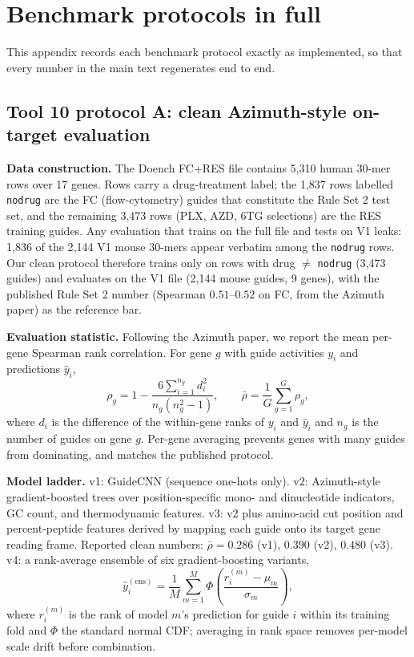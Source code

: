 \section{Benchmark protocols in full}
This appendix records each benchmark protocol exactly as implemented, so that
every number in the main text regenerates end to end.

\subsection{Tool 10 protocol A: clean Azimuth-style on-target evaluation}
\textbf{Data construction.} The Doench FC+RES file contains 5{,}310 human
30-mer rows over 17 genes. Rows carry a drug-treatment label; the 1{,}837
rows labelled \texttt{nodrug} are the FC (flow-cytometry) guides that
constitute the Rule Set 2 test set, and the remaining 3{,}473 rows (PLX,
AZD, 6TG selections) are the RES training guides. Any evaluation that trains
on the full file and tests on V1 leaks: 1{,}836 of the 2{,}144 V1 mouse
30-mers appear verbatim among the \texttt{nodrug} rows. Our clean protocol
therefore trains only on rows with drug $\neq$ \texttt{nodrug}
(3{,}473 guides) and evaluates on the V1 file (2{,}144 mouse guides,
9 genes), with the published Rule Set 2 number (Spearman $0.51$--$0.52$ on
FC, from the Azimuth paper) as the reference bar.

\textbf{Evaluation statistic.} Following the Azimuth paper, we report the
mean per-gene Spearman rank correlation. For gene $g$ with guide activities
$y_i$ and predictions $\hat y_i$,
\begin{equation}
\rho_g = 1 - \frac{6 \sum_{i=1}^{n_g} d_i^2}{n_g (n_g^2 - 1)},
\qquad
\bar\rho = \frac{1}{G}\sum_{g=1}^{G} \rho_g,
\end{equation}
where $d_i$ is the difference of the within-gene ranks of $y_i$ and
$\hat y_i$ and $n_g$ is the number of guides on gene $g$. Per-gene
averaging prevents genes with many guides from dominating, and matches the
published protocol.

\textbf{Model ladder.} v1: GuideCNN (sequence one-hots only). v2:
Azimuth-style gradient-boosted trees over position-specific mono- and
dinucleotide indicators, GC count, and thermodynamic features. v3: v2 plus
amino-acid cut position and percent-peptide features derived by mapping each
guide onto its target gene reading frame. Reported clean numbers:
$\bar\rho = 0.286$ (v1), $0.390$ (v2), $0.480$ (v3). v4: a rank-average
ensemble of six gradient-boosting variants,
\begin{equation}
\hat y_i^{(\mathrm{ens})} = \frac{1}{M}\sum_{m=1}^{M}
\Phi\!\left(\frac{r_i^{(m)} - \mu_m}{\sigma_m}\right),
\end{equation}
where $r_i^{(m)}$ is the rank of model $m$'s prediction for guide $i$ within
its training fold and $\Phi$ the standard normal CDF; averaging in rank space
removes per-model scale drift before combination.

